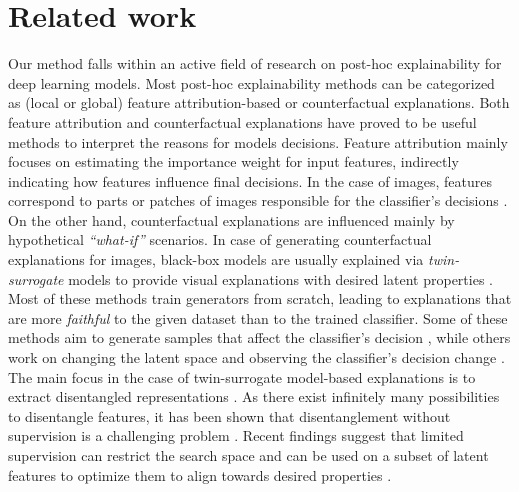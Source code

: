 \documentclass{article}
\newcommand{\akcom}[2][]{\todo[author=AK, #1]{#2}}
\newcommand{\ftcom}[2][]{\todo[author=FT, #1]{#2}}
\newcommand{\ftdel}[1]{\textcolor{olive}{$\times$ #1}}
\begin{document}
\section{Related work}
Our method falls within an active field of research on post-hoc explainability for deep learning models.
Most post-hoc explainability methods can be categorized as (local or global) feature attribution-based or counterfactual explanations. 
Both feature attribution \cite{lime, SHAP} and counterfactual explanations \cite{goyal2019counterfactual, denton2019detecting} have proved to be useful methods to interpret the reasons for models decisions.
Feature attribution mainly focuses on estimating the importance weight for input features, indirectly indicating how features influence final decisions. 
In the case of images, features correspond to parts or patches of images responsible for the classifier's decisions \cite{lime}.
On the other hand, counterfactual explanations are influenced mainly by hypothetical \emph{``what-if''} scenarios. 
In case of generating counterfactual explanations for images,
black-box models are usually explained via \emph{twin-surrogate} models to provide visual explanations with desired latent properties \cite{dhurandhar2018explanations, denton2019detecting, goyal2019counterfactual, joshi2019towards, razavi2019generating, lang2021explaining}.
Most of these methods train generators from scratch, leading to explanations that are more \emph{faithful} to the given dataset than to the trained classifier. 
Some of these methods aim to generate samples that affect the classifier's decision \cite{dhurandhar2018explanations, joshi2019towards}, while others work on changing the latent space and observing the classifier’s decision change \cite{denton2019detecting}. 
%
The main focus in the case of twin-surrogate model-based explanations is to extract disentangled representations \cite{higgins2016beta}.
As there exist infinitely many possibilities to disentangle features, it has been shown that disentanglement without supervision is a challenging problem \cite{locatello2019challenging}.
Recent findings suggest that limited supervision can restrict the search space and 
can be used on a subset of latent features to optimize them to align towards desired properties \cite{locatello2020weakly}. 
\end{document}
